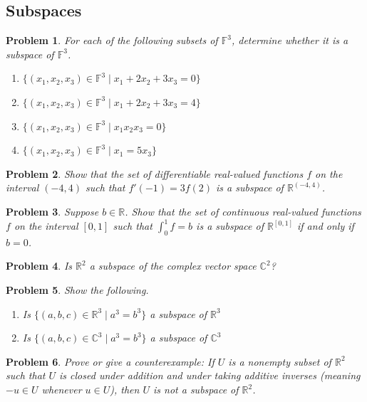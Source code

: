 \documentclass[12pt]{article}
\newcommand{\C}{\mathbb{C}}
\newcommand{\R}{\mathbb{R}}
\newcommand{\F}{\mathbb{F}}
\theoremstyle{problem}
\newtheorem{problem}{Problem}
\theoremstyle{remark}
\begin{document}
\subsection{Subspaces}
\begin{problem}
For each of the following subsets of $\F^3$, determine whether it is a subspace of $\F^3$. 
\begin{enumerate}
    \item $\{(x_1,x_2,x_3) \in \F^3 \mid x_1 + 2x_2  + 3x_3 = 0\}$
    \item $\{(x_1,x_2,x_3) \in \F^3 \mid x_1 + 2x_2  + 3x_3 = 4\}$
    \item $\{(x_1,x_2,x_3) \in \F^3 \mid x_1x_2 x_3 = 0\}$
    \item $\{(x_1,x_2,x_3) \in \F^3 \mid x_1 =5x_3\}$
\end{enumerate}
\end{problem}

\begin{problem}
    Show that the set of differentiable real-valued functions $f$ on the interval $(-4,4)$ such that $f'(-1) = 3f(2)$ is a subspace of $\R^{(-4,4)}$.
\end{problem}

\begin{problem}
    Suppose $b \in \R$. Show that the set of continuous real-valued functions $f$ on the interval $\left[0,1\right]$ such that $\int_{0}^{1} f = b$ is a subspace of $\R^{\left[0,1\right]}$ if and only if $b = 0$.
\end{problem}

\begin{problem}
    Is $\R^2$ a subspace of the complex vector space $\C^2$?
\end{problem}

\begin{problem} Show the following.
    \begin{enumerate}
        \item Is $\{(a,b,c) \in \R^3 \mid a^3 =b^3\}$ a subspace of $\R^3$
        \item Is $\{(a,b,c) \in \C^3 \mid a^3 =b^3\}$ a subspace of $\C^3$
    \end{enumerate}
\end{problem}

\begin{problem}
    Prove or give a counterexample: If $U$ is a nonempty subset of $\R^2$ such that $U$ is closed under addition and under taking additive inverses (meaning $-u \in U$  whenever $u \in U$), then $U$ is not a subspace of $\R^2$.
\end{problem}
\end{document}
